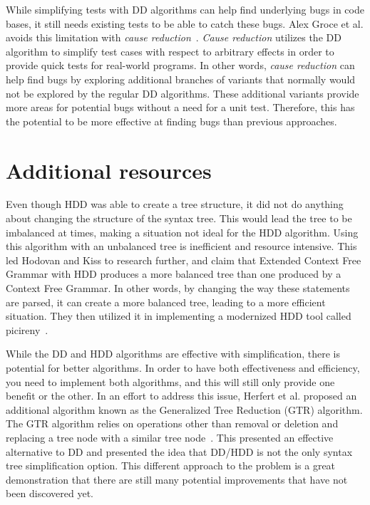 While simplifying tests with DD algorithms can help find underlying bugs in code bases, it still needs existing tests to be able to catch these bugs. Alex Groce et al. avoids this limitation with \emph{cause reduction}~\cite{groce_alipour_zhang_chen_regehr}. \emph{Cause reduction} utilizes the DD algorithm to simplify test cases with respect to arbitrary effects in order to provide quick tests for real-world programs. In other words, \emph{cause reduction} can help find bugs by exploring additional branches of variants that normally would not be explored by the regular DD algorithms. These additional variants provide more areas for potential bugs without a need for a unit test. Therefore, this has the potential to be more effective at finding bugs than previous approaches. 

\section{Additional resources}
Even though HDD was able to create a tree structure, it did not do anything about changing the structure of the syntax tree. This would lead the tree to be imbalanced at times, making a situation not ideal for the HDD algorithm. Using this algorithm with an unbalanced tree is inefficient and resource intensive. This led Hodovan and Kiss to research further, and claim that Extended Context Free Grammar with HDD produces a more balanced tree than one produced by a Context Free Grammar. In other words, by changing the way these statements are parsed, it can create a more balanced tree, leading to a more efficient situation. They then utilized it in implementing a modernized HDD tool called picireny~\cite{hodovan2016modernizing}. 

While the DD and HDD algorithms are effective with simplification, there is potential for better algorithms. In order to have both effectiveness and efficiency, you need to implement both algorithms, and this will still only provide one benefit or the other. In an effort to address this issue, Herfert et al. proposed an additional algorithm known as the Generalized Tree Reduction (GTR) algorithm. The GTR algorithm relies on operations other than removal or deletion and replacing a tree node with a similar tree node~\cite{Herfert2017GTR}. This presented an effective alternative to DD and presented the idea that DD/HDD is not the only syntax tree simplification option. This different approach to the problem is a great demonstration that there are still many potential improvements that have not been discovered yet. 


